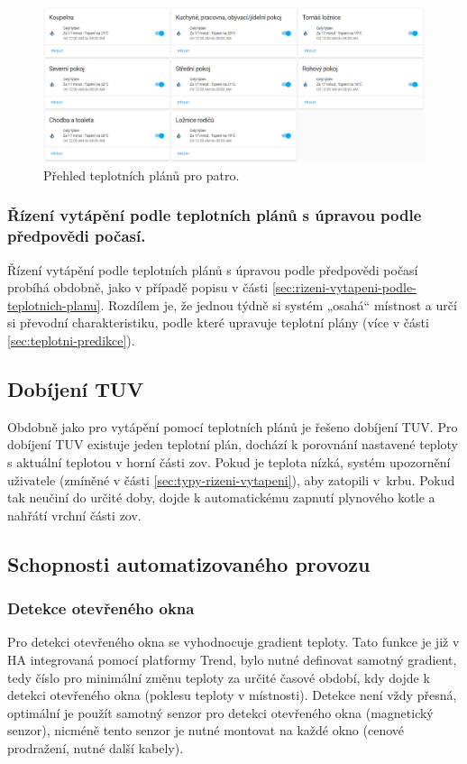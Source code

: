 \begin{figure}[H]
    \centering
    \includegraphics[width=\textwidth]{images/software-ha/teplotni-plany-prehled-ha.png}
    \caption{Přehled teplotních plánů pro patro.}
    \label{fig:teplotni-plany-prehled-ha}
\end{figure}

\subsubsection{Řízení vytápění podle teplotních plánů s úpravou podle předpovědi počasí.} 
\label{sec:rizeni-vytapeni-podle-teplotnich-planu-s-upravou-podle-predpovedi-pocasi}
Řízení vytápění podle teplotních plánů s úpravou podle předpovědi počasí probíhá obdobně, jako v případě popisu v části \ref{sec:rizeni-vytapeni-podle-teplotnich-planu}. Rozdílem je, že jednou týdně si systém „osahá“ místnost a určí si převodní charakteristiku, podle které  upravuje teplotní plány (více v části \ref{sec:teplotni-predikce}).

\subsection{Dobíjení TUV}
Obdobně jako pro vytápění pomocí teplotních plánů je řešeno dobíjení TUV. Pro dobíjení TUV existuje jeden teplotní plán, dochází k porovnání nastavené teploty s aktuální teplotou v horní části \acrshort{zov}. Pokud je teplota nízká, systém upozornění uživatele (zmíněné v části \ref{sec:typy-rizeni-vytapeni}), aby zatopili v~krbu. Pokud tak neučiní do určité doby, dojde k automatickému zapnutí plynového kotle a nahřátí vrchní části \acrshort{zov}. 

\subsection{Schopnosti automatizovaného provozu}
\subsubsection{Detekce otevřeného okna}
\label{sec:detekce-otevreneho-okna}
Pro detekci otevřeného okna se vyhodnocuje gradient teploty. Tato funkce je již v HA integrovaná pomocí platformy Trend, bylo nutné definovat samotný gradient, tedy číslo pro minimální změnu teploty za určité časové období, kdy dojde k detekci otevřeného okna (poklesu teploty v místnosti). Detekce není vždy přesná, optimální je použít samotný senzor pro detekci otevřeného okna (magnetický senzor), nicméně tento senzor je nutné montovat na každé okno (cenové prodražení, nutné další kabely).

